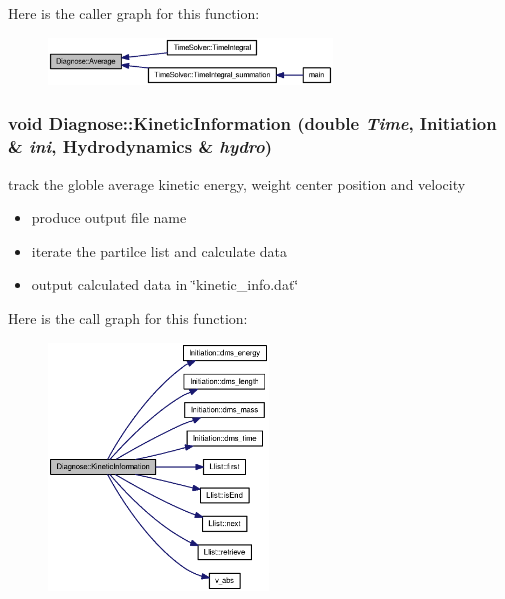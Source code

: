 Here is the caller graph for this function:\nopagebreak
\begin{figure}[H]
\begin{center}
\leavevmode
\includegraphics[width=214pt]{classDiagnose_8c14b3fa58083f64be2018bd0462604d_icgraph}
\end{center}
\end{figure}
\hypertarget{classDiagnose_9c73b32dc8facce488617780250c14bf}{
\subsubsection[{KineticInformation}]{\setlength{\rightskip}{0pt plus 5cm}void Diagnose::KineticInformation (double {\em Time}, \/  {\bf Initiation} \& {\em ini}, \/  {\bf Hydrodynamics} \& {\em hydro})}}
\label{classDiagnose_9c73b32dc8facce488617780250c14bf}


track the globle average kinetic energy, weight center position and velocity 



\begin{itemize}
\item produce output file name

\item iterate the partilce list and calculate data

\item output calculated data in \char`\"{}kinetic\_\-info.dat\char`\"{} \end{itemize}


Here is the call graph for this function:\nopagebreak
\begin{figure}[H]
\begin{center}
\leavevmode
\includegraphics[width=166pt]{classDiagnose_9c73b32dc8facce488617780250c14bf_cgraph}
\end{center}
\end{figure}


